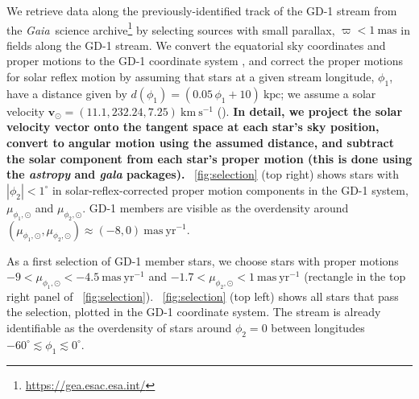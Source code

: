 \documentclass[modern]{aastex62}
\newcommand{\package}[1]{\textsl{#1}}
\newcommand{\gaia}{\textsl{Gaia}}
\newcommand{\kms}{\ensuremath{\textrm{km}~\textrm{s}^{-1}}}
\newcommand{\bs}[1]{\boldsymbol{#1}}
\newcommand{\masyr}{\ensuremath{\textrm{mas}~\textrm{yr}^{-1}}}
\newcommand{\changes}[1]{{\textbf{#1}}}
\begin{document}
We retrieve data along the previously-identified track of the GD-1 stream
from the \gaia\ science archive\footnote{\url{https://gea.esac.esa.int/}} by
selecting sources with small parallax, $\varpi < 1~\textrm{mas}$ in fields along the GD-1 stream.
We convert the equatorial sky coordinates and proper motions %
to the GD-1 coordinate system \citep[$\phi_1, \phi_2$,][]{Koposov:2010}, and correct the proper motions for solar reflex
motion by assuming that stars at a given stream longitude, $\phi_1$, have a
distance given by $d(\phi_1) = (0.05 \, \phi_1 + 10)~\textrm{kpc}$;
we assume a solar velocity $\bs{v}_\odot = (11.1, 232.24, 7.25)~\kms$
(\citealt{Schonrich:2010, Bovy:2015}).
\changes{In detail, we project the solar velocity vector onto the tangent space at each star's sky position, convert to angular motion using the assumed distance, and subtract the solar component from each star's proper motion (this is done using the \package{astropy} \citep{astropy} and \package{gala} \citep{gala} packages).}
\figurename~\ref{fig:selection} (top right) shows stars with $|\phi_2| <
1^\circ$ in solar-reflex-corrected proper motion components in the GD-1 system,
$\mu_{\phi_1, \odot}$ and $\mu_{\phi_2, \odot}$.
GD-1 members are visible as the overdensity around $(\mu_{\phi_1, \odot},
\mu_{\phi_2, \odot}) \approx (-8, 0)~\masyr$.

As a first selection of GD-1 member stars, we choose stars with proper motions
$-9 < \mu_{\phi_1, \odot} < -4.5~\masyr$ and $-1.7 < \mu_{\phi_2, \odot} <
1~\masyr$ (rectangle in the top right panel of
\figurename~\ref{fig:selection}).
\figurename~\ref{fig:selection} (top left) shows all stars that pass the
selection, plotted in the GD-1 coordinate system.
The stream is already identifiable as the overdensity of stars around $\phi_2 =
0$ between longitudes $-60^\circ \lesssim \phi_1 \lesssim 0^\circ$.
\end{document}
